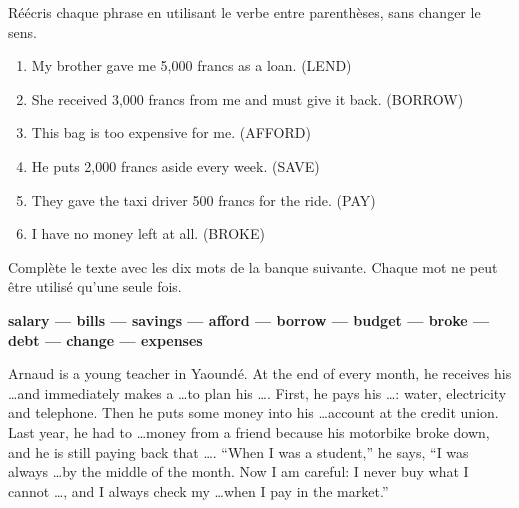 \documentclass[11pt]{article}
\begin{document}
\begin{exercice}
Réécris chaque phrase en utilisant le verbe entre parenthèses, sans changer le sens.
\begin{enumerate}
\item My brother gave me 5,000 francs as a loan. (LEND)
\item She received 3,000 francs from me and must give it back. (BORROW)
\item This bag is too expensive for me. (AFFORD)
\item He puts 2,000 francs aside every week. (SAVE)
\item They gave the taxi driver 500 francs for the ride. (PAY)
\item I have no money left at all. (BROKE)
\end{enumerate}
\end{exercice}

\begin{exercice}
Complète le texte avec les dix mots de la banque suivante. Chaque mot ne peut être utilisé qu'une seule fois.
\begin{center}
\textbf{salary — bills — savings — afford — borrow — budget — broke — debt — change — expenses}
\end{center}
\begin{textebox}
Arnaud is a young teacher in Yaoundé. At the end of every month, he receives his \ldots and immediately makes a \ldots to plan his \ldots. First, he pays his \ldots: water, electricity and telephone. Then he puts some money into his \ldots account at the credit union. Last year, he had to \ldots money from a friend because his motorbike broke down, and he is still paying back that \ldots. “When I was a student,” he says, “I was always \ldots by the middle of the month. Now I am careful: I never buy what I cannot \ldots, and I always check my \ldots when I pay in the market.”
\end{textebox}
\end{exercice}
\end{document}
